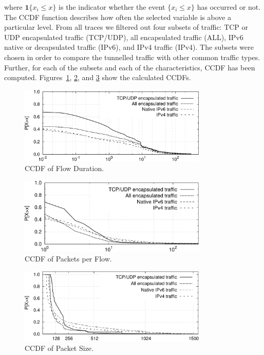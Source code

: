 where $\mathbf{1}\{x_{i}\leq x\}$ is the indicator whether the event $\{x_{i}\leq x\}$ has occurred or not. The CCDF function describes how often the selected variable is above a particular level. From all traces we filtered out four subsets of traffic: TCP or UDP encapsulated traffic (TCP/UDP), all encapsulated traffic (ALL), IPv6 native or decapsulated traffic (IPv6), and IPv4 traffic (IPv4). The subsets were chosen in order to compare the tunnelled traffic with other common traffic types. Further, for each of the subsets and each of the characteristics, CCDF has been computed. Figures~\ref{fig:ipv6-tunnels-cdf_duration}, \ref{fig:ipv6-tunnels-cdf_packets}, and \ref{fig:ipv6-tunnels-cdf_bytes} show the calculated CCDFs.

\begin{figure}[!tb]
     \centering
     \includegraphics[width=0.8\textwidth]{figures/paper-tunnels/cdf_functions/cdf_duration}
     \caption{CCDF of Flow Duration.}
     \label{fig:ipv6-tunnels-cdf_duration}
\end{figure}

\begin{figure}[!tb]
     \centering
     \includegraphics[width=0.8\textwidth]{figures/paper-tunnels/cdf_functions/cdf_packets}
     \caption{CCDF of Packets per Flow.}
     \label{fig:ipv6-tunnels-cdf_packets}
\end{figure}

\begin{figure}[!tb]
     \centering
     \includegraphics[width=0.8\textwidth]{figures/paper-tunnels/cdf_functions/cdf_bytes}
     \caption{CCDF of Packet Size.}
     \label{fig:ipv6-tunnels-cdf_bytes}
\end{figure}

